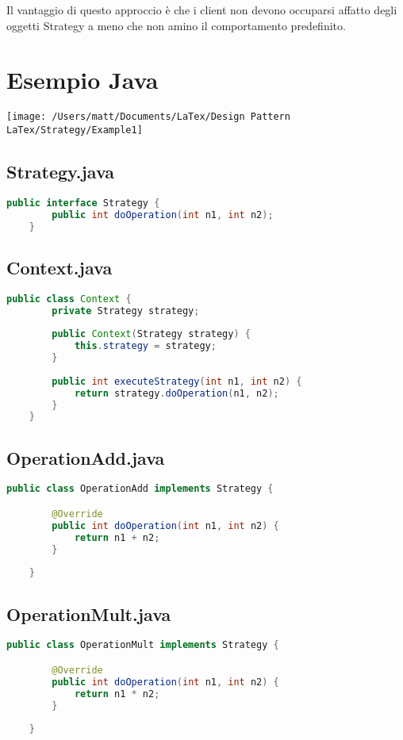 Il vantaggio di questo approccio è che i client non devono occuparsi affatto degli oggetti Strategy a meno che non amino il comportamento predefinito.


\section{Esempio Java}
\texttt{[image: /Users/matt/Documents/LaTex/Design Pattern LaTex/Strategy/Example1]}

\subsection{Strategy.java}
\begin{lstlisting}[language=java]
    public interface Strategy {
        public int doOperation(int n1, int n2);
    }
\end{lstlisting}

\subsection{Context.java}
\begin{lstlisting}[language=java]
    public class Context {
        private Strategy strategy;
    
        public Context(Strategy strategy) {
            this.strategy = strategy;
        }
    
        public int executeStrategy(int n1, int n2) {
            return strategy.doOperation(n1, n2);
        }
    }
\end{lstlisting}

\subsection{OperationAdd.java}
\begin{lstlisting}[language=java]
    public class OperationAdd implements Strategy {

        @Override
        public int doOperation(int n1, int n2) {
            return n1 + n2;
        }
        
    }
\end{lstlisting}

\subsection{OperationMult.java}
\begin{lstlisting}[language=java]
    public class OperationMult implements Strategy {

        @Override
        public int doOperation(int n1, int n2) {
            return n1 * n2;
        }
        
    }
\end{lstlisting}

